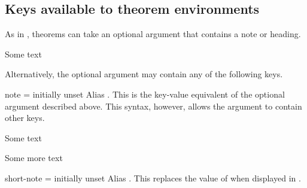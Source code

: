 \documentclass{ltxdoc}
\begin{document}
\subsection{Keys available to theorem environments} \label{in-doc-keys}

As in , theorems can take an optional argument that contains a note or heading.

\begin{keythmscode}[]
\begin{theorem}
Some text
\end{theorem}
\end{keythmscode}

Alternatively, the optional argument may contain any of the following keys.

\begin{docKey}{note}
  {=}
  {initially unset}
Alias .
This is the key-value equivalent of the optional argument described above.
This syntax, however, allows the argument to contain other keys.

\begin{keythmscode}[]
\begin{theorem}
Some text
\end{theorem}
\begin{theorem}[note=another heading]
Some more text
\end{theorem}
\end{keythmscode}

\end{docKey}

\begin{docKey}{short-note}
  {=}
  {initially unset}
Alias .
This replaces the value of  when displayed in .
\end{docKey}

\end{document}
